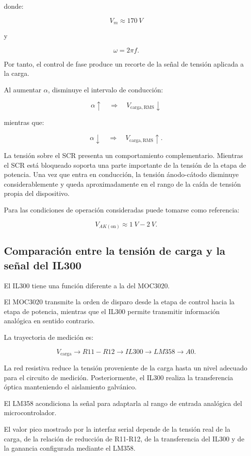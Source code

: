\documentclass[12pt]{article}
\begin{document}
donde:

\[
V_m\approx\SI{170}{V}
\]

y

\[
\omega=2\pi f.
\]

Por tanto, el control de fase produce un recorte de la señal de tensión
aplicada a la carga.

Al aumentar $\alpha$, disminuye el intervalo de conducción:

\[
\alpha\uparrow
\quad\Rightarrow\quad
V_{\mathrm{carga,RMS}}\downarrow
\]

mientras que:

\[
\alpha\downarrow
\quad\Rightarrow\quad
V_{\mathrm{carga,RMS}}\uparrow.
\]

La tensión sobre el SCR presenta un comportamiento complementario. Mientras
el SCR está bloqueado soporta una parte importante de la tensión de la
etapa de potencia. Una vez que entra en conducción, la tensión ánodo-cátodo
disminuye considerablemente y queda aproximadamente en el rango de la
caída de tensión propia del dispositivo.

Para las condiciones de operación consideradas puede tomarse como
referencia:

\[
V_{AK(\mathrm{on})}\approx\SI{1}{V}-\SI{2}{V}.
\]

\subsection{Comparación entre la tensión de carga y la señal del IL300}

El IL300 tiene una función diferente a la del MOC3020.

El MOC3020 transmite la orden de disparo desde la etapa de control hacia la
etapa de potencia, mientras que el IL300 permite transmitir información
analógica en sentido contrario.

La trayectoria de medición es:

\[
V_{\mathrm{carga}}
\rightarrow
R11-R12
\rightarrow
IL300
\rightarrow
LM358
\rightarrow
A0.
\]

La red resistiva reduce la tensión proveniente de la carga hasta un nivel
adecuado para el circuito de medición. Posteriormente, el IL300 realiza la
transferencia óptica manteniendo el aislamiento galvánico.

El LM358 acondiciona la señal para adaptarla al rango de entrada analógica
del microcontrolador.

El valor pico mostrado por la interfaz serial depende de la tensión real de
la carga, de la relación de reducción de R11-R12, de la transferencia del
IL300 y de la ganancia configurada mediante el LM358.
\end{document}
